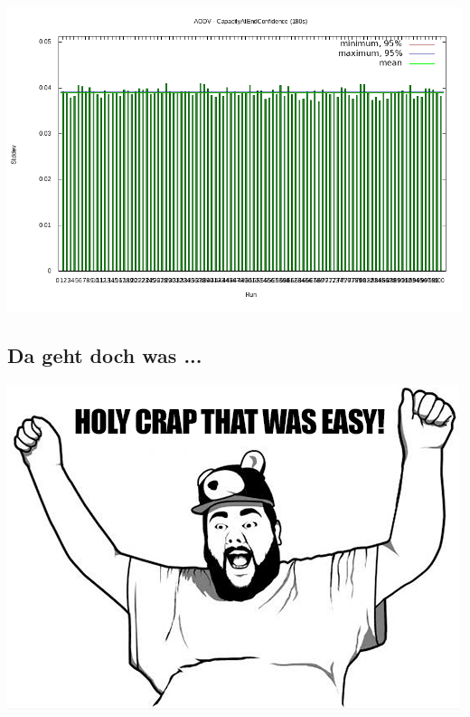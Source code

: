 \documentclass[11pt,landscape]{beamer}
\begin{document}
\begin{frame}{\insertsubsection}
  \begin{center}
\includegraphics[scale=0.45]{aodv-100}
  \end{center}
\end{frame}


\subsection{Da geht doch was ...}

\begin{frame}{\insertsubsection}
  \begin{center}
\includegraphics[scale=0.4]{kid1}
  \end{center}
\end{frame}
\end{document}
